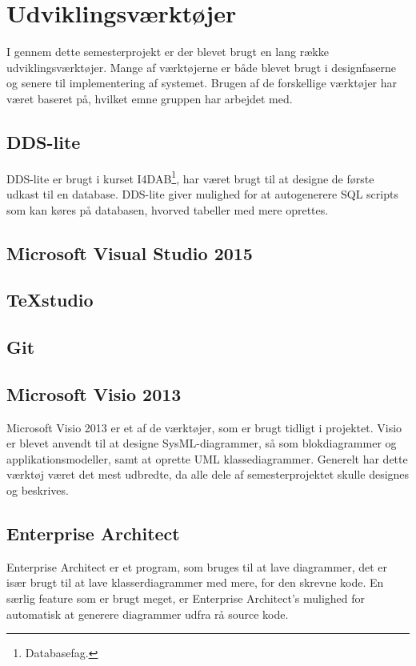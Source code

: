 \chapter{Udviklingsværktøjer}

I gennem dette semesterprojekt er der blevet brugt en lang række udviklingsværktøjer. Mange af værktøjerne er både blevet brugt i designfaserne og senere til implementering af systemet. Brugen af de forskellige værktøjer har været baseret på, hvilket emne gruppen har arbejdet med.

\section*{DDS-lite}
DDS-lite er brugt i kurset I4DAB\footnote{Databasefag.}, har været brugt til at designe de første udkast til en database. DDS-lite giver mulighed for at autogenerere SQL scripts som kan køres på databasen, hvorved tabeller med mere oprettes.

\section*{Microsoft Visual Studio 2015}

\section*{TeXstudio}

\section*{Git}

\section*{Microsoft Visio 2013}
Microsoft Visio 2013 er et af de værktøjer, som er brugt tidligt i projektet. Visio er blevet anvendt til at designe SysML-diagrammer, så som blokdiagrammer og applikationsmodeller, samt at oprette UML klassediagrammer. Generelt har dette værktøj været det mest udbredte, da alle dele af semesterprojektet skulle designes og beskrives.

\section*{Enterprise Architect}
Enterprise Architect er et program, som bruges til at lave diagrammer, det er især brugt til at lave klasserdiagrammer med mere, for den skrevne kode. En særlig feature som er brugt meget, er Enterprise Architect's mulighed for automatisk at generere diagrammer udfra rå source kode.

